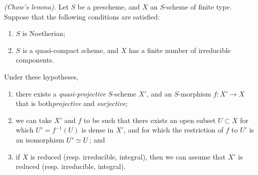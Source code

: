 \begin{thm}[5.6.1]
\label{2.5.6.1}
\emph{(Chow's lemma).}
Let $S$ be a prescheme, and $X$ an $S$-scheme of finite type.
Suppose that the following conditions are satisfied:
\begin{enumerate}[label=\emph{(\alph*)}]
  \item $S$ is Noetherian;
  \item $S$ is a quasi-compact scheme, and $X$ has a finite number of irreducible components.
\end{enumerate}
Under these hypotheses,
\begin{enumerate}[label=\emph{(\roman*)}]
  \item there exists a \emph{quasi-projective} $S$-scheme $X'$, and an $S$-morphism $f:X'\to X$ that is both\emph{projective} and \emph{surjective};
  \item we can take $X'$ and $f$ to be such that there exists an open subset $U\subset X$ for which $U'=f^{-1}(U)$ is dense in $X'$, and for which the restriction of $f$ to $U'$ is an isomorphism $U'\simeq U$; and
  \item if $X$ is reduced (resp. irreducible, integral), then we can assume that $X'$ is reduced (resp. irreducible, integral).
\end{enumerate}
\end{thm}

